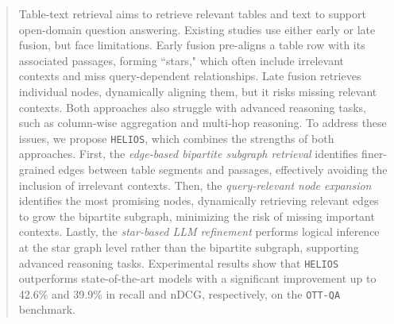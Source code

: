 \begin{abstract}
\vspace{-1.5mm}

Table-text retrieval aims to retrieve relevant tables and text to support open-domain question answering. 
Existing studies use either early or late fusion, but face limitations. 
Early fusion pre-aligns a table row with its associated passages, forming ``stars," which often include irrelevant contexts and miss query-dependent relationships. 
Late fusion retrieves individual nodes, dynamically aligning them, but it risks missing relevant contexts. 
Both approaches also struggle with advanced reasoning tasks, such as column-wise aggregation and multi-hop reasoning. 
To address these issues, we propose \texttt{HELIOS}, which combines the strengths of both approaches. 
First, the \emph{edge-based bipartite subgraph retrieval} identifies finer-grained edges between table segments and passages, effectively avoiding the inclusion of irrelevant contexts. 
Then, the \emph{query-relevant node expansion} identifies the most promising nodes, dynamically retrieving relevant edges to grow the bipartite subgraph, minimizing the risk of missing important contexts. 
Lastly, the \emph{star-based LLM refinement} performs logical inference at the star graph level rather than the bipartite subgraph, supporting advanced reasoning tasks. 
Experimental results show that \texttt{HELIOS} outperforms state-of-the-art models with a significant improvement up to 42.6\% and 39.9\% in recall and nDCG, respectively, on the \texttt{OTT-QA} benchmark.
\end{abstract}
